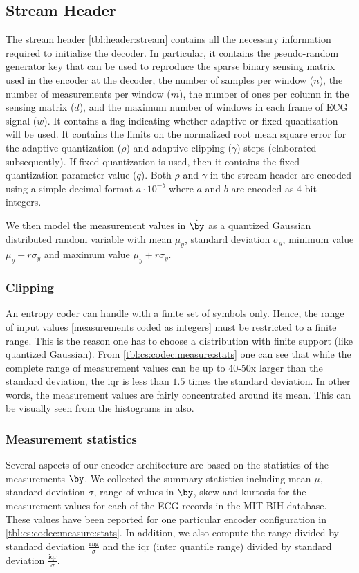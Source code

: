 \subsection{Stream Header}
The stream header \cref{tbl:header:stream}
contains all the necessary information
required to initialize the decoder.
In particular, it contains the pseudo-random
generator key that can be used to reproduce
the sparse binary sensing matrix used in the
encoder at the decoder,
the number of samples per window ($n$),
the number of measurements per window ($m$),
the number of ones per column in the sensing matrix
($d$),
and the maximum number of windows in each frame
of ECG signal ($w$).
It contains a flag indicating whether adaptive
or fixed quantization will be used.
It contains the limits on the normalized
root mean square error for
the adaptive quantization ($\rho$)
and adaptive clipping ($\gamma$) steps (elaborated subsequently).
If fixed quantization is used, then it contains
the fixed quantization parameter value ($q$).
Both $\rho$ and $\gamma$ in the stream header
are encoded using a simple decimal format $a \cdot 10^{-b}$ where $a$
and $b$ are encoded as 4-bit integers.

We then model the measurement values in $\hat{\by}$
as a quantized Gaussian distributed random variable
with mean $\mu_y$, standard deviation $\sigma_y$,
minimum value $\mu_y - r \sigma_y$ and maximum value $\mu_y + r \sigma_y$.

\subsubsection{Clipping}

An entropy coder can handle with a finite set of symbols
only. Hence, the range of input values [measurements
coded as integers] must be restricted to a finite range.
This is the reason one has to choose a distribution
with finite support (like quantized Gaussian).
From \cref{tbl:cs:codec:measure:stats} one can see that
while the complete range of measurement values can be
up to 40-50x larger than the standard deviation, the iqr
is less than $1.5$ times the standard deviation. In other
words, the measurement values are fairly concentrated
around its mean. This can be visually seen from the
histograms in  also.


\subsubsection{Measurement statistics}
Several aspects of our encoder architecture are based on the
statistics of the measurements $\by$. We collected the summary
statistics including mean $\mu$, standard deviation $\sigma$,
range of values in $\by$, skew and kurtosis
for the measurement values for each
of the ECG records in the MIT-BIH database. These values
have been reported for one particular encoder configuration
in \cref{tbl:cs:codec:measure:stats}.
In addition, we also compute the range divided by standard deviation
$\frac{\text{rng}}{\sigma}$
and the iqr (inter quantile range) divided by standard deviation
$\frac{\text{iqr}}{\sigma}$.


